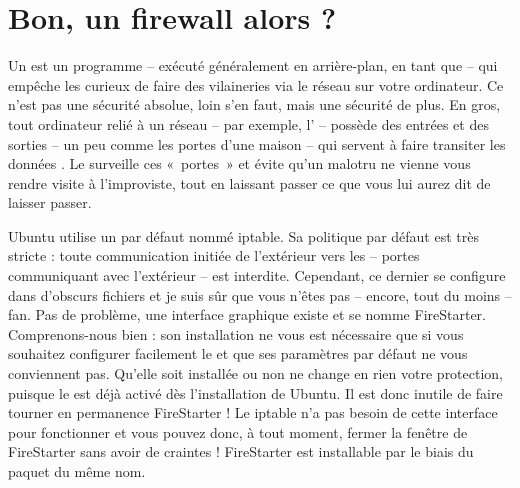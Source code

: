 \section{Bon, un firewall alors ?}
Un  est un programme -- exécuté généralement en arrière-plan, en tant que  -- qui empêche les curieux de faire des vilaineries via le réseau sur votre ordinateur. Ce n'est pas une sécurité absolue, loin s'en faut, mais une sécurité de plus. En gros, tout ordinateur relié à un réseau -- par exemple, l' -- possède des entrées et des sorties -- un peu comme les portes d'une maison -- qui servent à faire transiter les données . Le  surveille ces «~portes~» et évite qu'un malotru ne vienne vous rendre visite à l'improviste, tout en laissant passer ce que vous lui aurez dit de laisser passer.\par
Ubuntu utilise un  par défaut nommé iptable. Sa politique par défaut est très stricte : toute communication initiée de l'extérieur vers les  -- portes communiquant avec l'extérieur -- est interdite. Cependant, ce dernier se configure dans d'obscurs fichiers  et je suis sûr que vous n'êtes pas -- encore, tout du moins -- fan. Pas de problème, une interface graphique existe et se nomme FireStarter.\\
Comprenons-nous bien : son installation ne vous est nécessaire que si vous souhaitez configurer facilement le  et que ses paramètres par défaut ne vous conviennent pas. Qu'elle soit installée ou non ne change en rien votre protection, puisque le  est déjà activé dès l'installation de Ubuntu. Il est donc inutile de faire tourner en permanence FireStarter ! Le  iptable n'a pas besoin de cette interface pour fonctionner et vous pouvez donc, à tout moment, fermer la fenêtre de FireStarter sans avoir de craintes ! FireStarter est installable par le biais du paquet du même nom.
